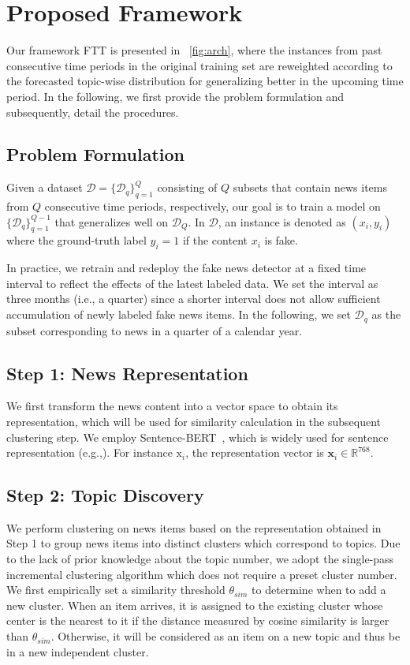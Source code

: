 \documentclass[11pt]{article}
\begin{document}
\section{Proposed Framework}
Our framework FTT is presented in \figurename~\ref{fig:arch}, where the instances from past consecutive time periods in the original training set are reweighted according to the forecasted topic-wise distribution for generalizing better in the upcoming time period. In the following, we first provide the problem formulation and subsequently, detail the procedures.

\subsection{Problem Formulation}
Given a dataset $\mathcal{D}=\{\mathcal{D}_q\}_{q=1}^Q$ consisting of $Q$ subsets that contain news items from $Q$ consecutive time periods, respectively, our goal is to train a model on $\{\mathcal{D}_q\}_{q=1}^{Q-1}$ that generalizes well on $\mathcal{D}_Q$. In $\mathcal{D}$, an instance is denoted as $(x_i, y_i)$ where the ground-truth label $y_i=1$ if the content $x_i$ is fake.

In practice, we retrain and redeploy the fake news detector at a fixed time interval to reflect the effects of the latest labeled data. We set the interval as three months (i.e., a quarter) since a shorter interval does not allow sufficient accumulation of newly labeled fake news items. In the following, we set $\mathcal{D}_q$ as the subset corresponding to news in a quarter of a calendar year. 

\subsection{Step 1: News Representation}
We first transform the news content into a vector space to obtain its representation, which will be used for similarity calculation in the subsequent clustering step.
We employ Sentence-BERT~\cite{reimers2019sentence}, which is widely used for sentence representation (e.g.,\citealp{shaar}). For instance $\mathrm{x}_i$, the representation vector is $\bm{x}_i \in \mathbb{R}^{768}$.

\subsection{Step 2: Topic Discovery}
We perform clustering on news items based on the representation obtained in Step 1 to group news items into distinct clusters which correspond to topics.
Due to the lack of prior knowledge about the topic number, we adopt the single-pass incremental clustering algorithm which does not require a preset cluster number.
We first empirically set a similarity threshold $\theta_{sim}$ to determine when to add a new cluster.
When an item arrives, it is assigned to the existing cluster whose center is the nearest to it if the distance measured by cosine similarity is larger than $\theta_{sim}$. Otherwise, it will be considered as an item on a new topic and thus be in a new independent cluster.
\end{document}
